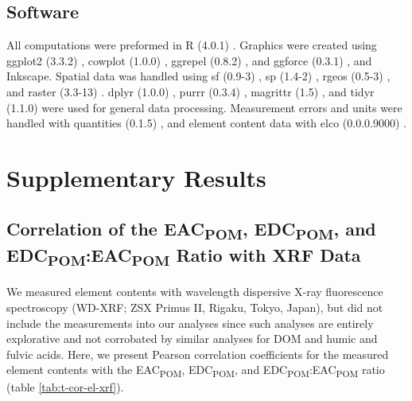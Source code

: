 \documentclass[draft,linenumbers]{agujournal2018}
\begin{document}
\subsection{Software}

All computations were preformed in R (4.0.1) \citep{RCoreTeam.2020}.
Graphics were created using ggplot2 (3.3.2) \citep{Wickham.2016},
cowplot (1.0.0) \citep{Wilke.2019}, ggrepel (0.8.2)
\citep{Slowikowski.2020}, and ggforce (0.3.1) \citep{Pedersen.2019}, and
Inkscape. Spatial data was handled using sf (0.9-3)
\citep{Pebesma.2018b}, sp (1.4-2) \citep{Pebesma.2005}, rgeos (0.5-3)
\citep{Bivand.2020}, and raster (3.3-13) \citep{Hijmans.2020}. dplyr
(1.0.0) \citep{Wickham.2020e}, purrr (0.3.4) \citep{Henry.2020},
magrittr (1.5) \citep{Bache.2014}, and tidyr (1.1.0)
\citep{Wickham.2020f} were used for general data processing. Measurement
errors and units were handled with quantities (0.1.5)
\citep{Pebesma.2016, Ucar.2019}, and element content data with elco
(0.0.0.9000) \citep{Teickner.2020e}.

\section{Supplementary Results}

\subsection{\texorpdfstring{Correlation of the EAC\textsubscript{POM},
EDC\textsubscript{POM}, and
EDC\textsubscript{POM}:EAC\textsubscript{POM} Ratio with XRF
Data}{Correlation of the EAC, EDC, and EDC:EAC Ratio with XRF Data}}

We measured element contents with wavelength dispersive X-ray
fluorescence spectroscopy (WD-XRF; ZSX Primus II, Rigaku, Tokyo, Japan),
but did not include the measurements into our analyses since such
analyses are entirely explorative and not corrobated by similar analyses
for DOM and humic and fulvic acids. Here, we present Pearson correlation
coefficients for the measured element contents with the
EAC\textsubscript{POM}, EDC\textsubscript{POM}, and
EDC\textsubscript{POM}:EAC\textsubscript{POM} ratio (table
\ref{tab:t-cor-el-xrf}).
\end{document}
